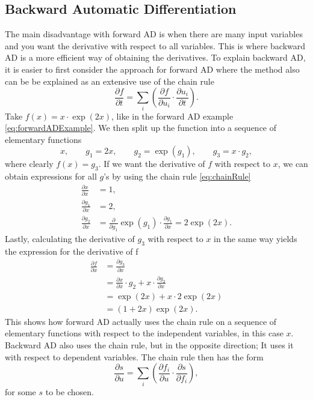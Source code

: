 \subsection{Backward Automatic Differentiation}
\label{sec:BackwardAD}
The main disadvantage with forward AD is when there are many input variables and you want the derivative with respect to all variables. This is where backward AD is a more efficient way of obtaining the derivatives. To explain backward AD, it is easier to first consider the approach for forward AD where the method also can be be explained as an extensive use of the chain rule
\begin{equation}
    \label{eq:chainRule}
    \frac{\partial f}{\partial t} = \sum_i\left(\frac{\partial f}{\partial u_i}\cdot\frac{\partial u_i}{\partial t}\right).
\end{equation}
Take $f(x) = x\cdot\exp(2x)$, like in the forward AD example \eqref{eq:forwardADExample}. We then split up the function into a sequence of elementary functions
\begin{equation}
    \label{eq:BackwardADSeperationSimple}
    x, \hspace{2em} g_1 = 2x, \hspace{2em} g_2 = \exp(g_1), \hspace{2em} g_3 = x\cdot g_2,
\end{equation}
where clearly $f(x) = g_3$. If we want the derivative of $f$ with respect to $x$, we can obtain expressions for all $g$'s by using the chain rule \eqref{eq:chainRule}
\begin{align*}
     \frac{\partial x}{\partial x} &= 1, \\
     \frac{\partial g_1}{\partial x} &= 2, \\
     \frac{\partial g_2}{\partial x} &= \frac{\partial}{\partial g_1}\exp(g_1)\cdot\frac{\partial g_1}{\partial x} = 2\exp(2x).
\end{align*}
Lastly, calculating the derivative of $g_3$ with respect to $x$ in the same way yields the expression for the derivative of f
\begin{align*}
    \frac{\partial f}{\partial x} &= \frac{\partial g_3}{\partial x}\\
    &=\frac{\partial x}{\partial x}\cdot g_2 + x\cdot\frac{\partial g_2}{\partial x}\\
    &= \exp(2x) + x\cdot 2\exp(2x) \\
    &= (1+2x)\exp(2x).
\end{align*}
This shows how forward AD actually uses the chain rule on a sequence of elementary functions with respect to the independent variables, in this case $x$. Backward AD also uses the chain rule, but in the opposite direction; It uses it with respect to dependent variables. The chain rule then has the form
\begin{equation}
    \label{eq:chainRuleReverse}
    \frac{\partial s}{\partial u} = \sum_i\left(\frac{\partial f_i}{\partial u}\cdot\frac{\partial s}{\partial f_i}\right),
\end{equation}
for some $s$ to be chosen.

